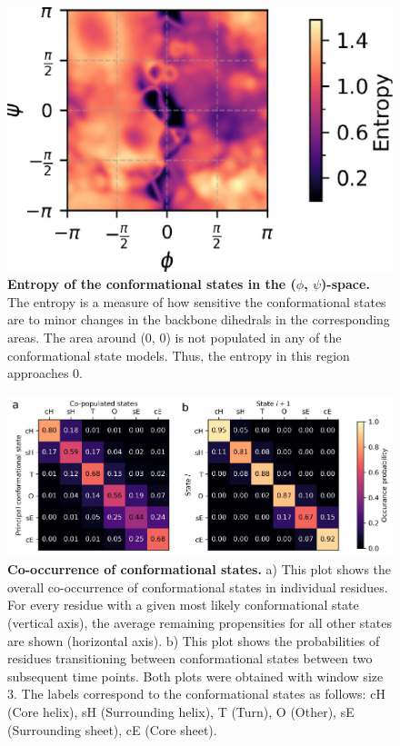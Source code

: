 \begin{figure}[H]
    \centering
    \includegraphics[width=0.8\linewidth]{constava//sup_figs/supfig14.pdf}
    \caption{\textbf{Entropy of the conformational states in the ($\phi$, $\psi$)-space.} The entropy is a measure of how sensitive the conformational states are to minor changes in the backbone dihedrals in the corresponding areas. The area around (0, 0) is not populated in any of the conformational state models. Thus, the entropy in this region approaches 0.}
    \label{fig:sup_fig_constava:entropy}
\end{figure}

\begin{figure}[H]
    \centering
    \includegraphics[width=1\linewidth]{constava//sup_figs/supfig15.pdf}
    \caption{\textbf{Co-occurrence of conformational states.} a) This plot shows the overall co-occurrence of conformational states in individual residues. For every residue with a given most likely conformational state (vertical axis), the average remaining propensities for all other states are shown (horizontal axis). b) This plot shows the probabilities of residues transitioning between conformational states between two subsequent time points. Both plots were obtained with window size 3. The labels correspond to the conformational states as follows: cH (Core helix), sH (Surrounding helix), T (Turn), O (Other), sE (Surrounding sheet), cE (Core sheet).}
    \label{fig:sup_fig_constava:co-occurrence}
\end{figure}

